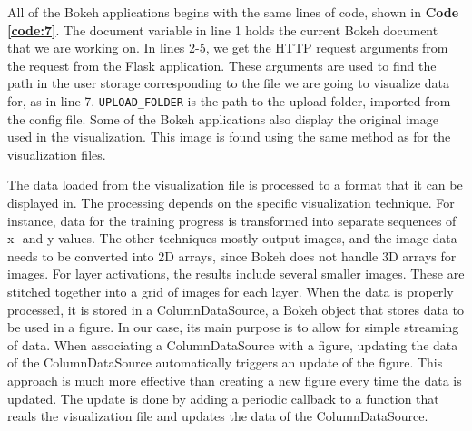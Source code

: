 All of the Bokeh applications begins with the same lines of code, shown in \textbf{Code \ref{code:7}}. The document variable in line 1 holds the current Bokeh document that we are working on. In lines 2-5, we get the HTTP request arguments from the request from the Flask application. These arguments are used to find the path in the user storage corresponding to the file we are going to visualize data for, as in line 7. \texttt{UPLOAD\_FOLDER} is the path to the upload folder, imported from the config file. Some of the Bokeh applications also display the original image used in the visualization. This image is found using the same method as for the visualization files. \\


\noindent The data loaded from the visualization file is processed to a format that it can be displayed in. The processing depends on the specific visualization technique. For instance, data for the training progress is transformed into separate sequences of x- and y-values. The other techniques mostly output images, and the image data needs to be converted into 2D arrays, since Bokeh does not handle 3D arrays for images. For layer activations, the results include several smaller images. These are stitched together into a grid of images for each layer. When the data is properly processed, it is stored in a ColumnDataSource, a Bokeh object that stores data to be used in a figure. In our case, its main purpose is to allow for simple streaming of data. When associating a ColumnDataSource with a figure, updating the data of the ColumnDataSource automatically triggers an update of the figure. This approach is much more effective than creating a new figure every time the data is updated. The update is done by adding a periodic callback to a function that reads the visualization file and updates the data of the ColumnDataSource.

